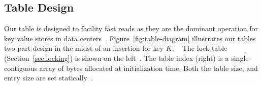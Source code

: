 


\subsection{Table Design}

Our table is designed to facility fast reads as they are the
dominant operation for key value stores in data
centers~\cite{facebook-memcached}.
Figure~\ref{fig:table-diagram} illustrates our tables
two-part design in the midst of an insertion for key $K$.
~ The lock table
(Section~\ref{sec:locking}) is shown on the left~. The table index (right) is a single
contiguous array of bytes allocated at initialization time.
Both the table size, and entry size are set
statically~. 

